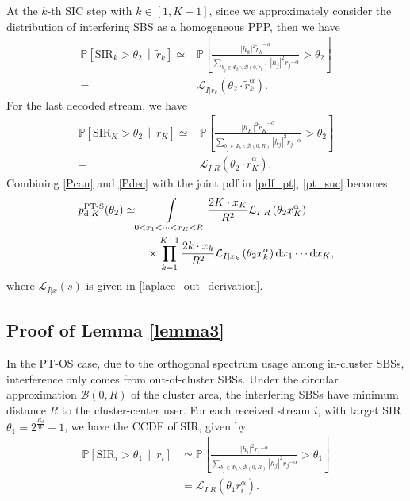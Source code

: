 \documentclass[twocolumns,10pt]{IEEEtran}
\begin{document}
At the $k$-th SIC step with $k\in[1,K-1]$, since we approximately consider the distribution of interfering SBS as a homogeneous PPP, then we have  
\begin{align}
\mathbb{P}\left[\text{SIR}_k>\theta_2 \,\middle|\ \widetilde{r}_k \right] 
\simeq &\mathbb{P}\left[\frac{\left|h_k\right|^2 {\widetilde{r}_k}^{-\alpha}}{\sum\limits_{b_j\in \Phi_b \backslash \mathcal{B}(0, \widetilde{r}_k)}|h_j|^2 {r_j}^{-\alpha}}>\theta_2 \right]\nonumber  \\
=& \mathcal{L}_{I|\widetilde{r}_k }(\theta_2\cdot \widetilde{r}_k ^{\alpha}).
\label{Pcan}
\end{align}  
For the last decoded stream, we have
\begin{align}
\mathbb{P}\left[\text{SIR}_K>\theta_2 \,\middle|\ \widetilde{r}_K\right]\simeq &\mathbb{P}\left[\frac{\left|h_K\right|^2 {\widetilde{r}_K}^{-\alpha}}{\sum\limits_{b_j\in \Phi_b \backslash \mathcal{B}(0, R)}|h_j|^2 {r_j}^{-\alpha}}>\theta_2 \right] \nonumber \\
=& \mathcal{L}_{I|R }(\theta_2\cdot \widetilde{r}_K ^{\alpha}).
\label{Pdec}
\end{align}
Combining \eqref{Pcan} and \eqref{Pdec}  with the joint pdf in \eqref{pdf_pt}, \eqref{pt_suc} becomes
\begin{equation}
\begin{split}
p_{\textnormal{d},K}^{\textnormal{PT-S}}(\theta_2)
\simeq  
& \int\limits_{0<x_1<\cdots<x_K<R} 
\frac{2 K\cdot x_K}{R^2} \mathcal{L}_{I|R}\left(\theta_2 x_K^\alpha\right)\\
& \quad\times \prod\limits_{k=1}^{K-1} \frac{2 k\cdot x_k}{R^2} \mathcal{L}_{I|x_k}\left(\theta_2 x_k^\alpha\right)
\textnormal{d}x_1 \cdots \textnormal{d}x_K ,
\end{split}
\end{equation}
where $\mathcal{L}_{I|x}(s)$ is given in \eqref{laplace_out_derivation}.


\subsection{Proof of Lemma \ref{lemma3} }
\label{appen3}
In the PT-OS case, due to the orthogonal spectrum usage among in-cluster SBSs, interference only comes from out-of-cluster SBSs. Under the circular approximation $\mathcal{B}(0, R)$ of the cluster area, the interfering SBSs have minimum distance $R$ to the cluster-center user.
For each received stream $i$, with target SIR $\theta_1=2^{\frac{R_d}{W}}-1$, we have the CCDF of SIR, given by
\begin{align}
\mathbb{P}\left[\text{SIR}_i>\theta_1 \,\middle|\ r_i\right]&\simeq\mathbb{P}\left[\frac{|h_i|^2 {r_i}^{-\alpha}}{\sum\limits_{b_j\in \Phi_b \backslash \mathcal{B}(0,R)} |h_j|^2 {r_j}^{-\alpha}}>\theta_1\right]  \nonumber  \\
&=\mathcal{L}_{I|R}\left(\theta_1 r_i^{\alpha}\right).
\label{ccdf_psuc_pt}
\end{align}
\end{document}
